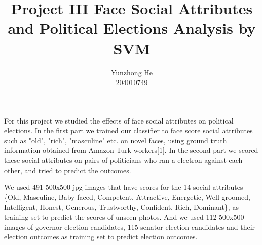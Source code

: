 \documentclass[12pt]{article}
\newenvironment{intro}[2][I Introduction]{\begin{trivlist}
\item[\hskip \labelsep {\bfseries #1}\hskip \labelsep {\bfseries #2}]}{\end{trivlist}}
\newenvironment{p1}[2][II Dataset]{\begin{trivlist}
\item[\hskip \labelsep {\bfseries #1}\hskip \labelsep {\bfseries #2}]}{\end{trivlist}}
\begin{document}
 
 
\title{Project III Face Social Attributes and Political Elections Analysis by SVM}
\author{Yunzhong He\\ %
204010749} %
 
\maketitle

\begin{intro}{}
\item{}
For this project we studied the effects of face social attributes on political elections. In the first part we trained our classifier to face score social attributes such as "old", "rich", "masculine" etc. on novel faces, using ground truth information obtained from Amazon Turk workers[1]. In the second part we scored these social attributes on pairs of politicians who ran a electron against each other, and tried to predict the outcomes.
\end{intro}

\begin{p1}{}
\item{}
We used 491 500x500 jpg images that have scores for the 14 social attributes \{Old, Masculine, Baby-faced, Competent, Attractive, Energetic, Well-groomed, Intelligent, Honest, Generous, Trustworthy, Confident, Rich, Dominant\}, as training set to predict the scores of unseen photos. And we used 112 500x500 images of governor election candidates, 115 senator election candidates and their election outcomes as training set to predict election outcomes.
\end{p1}
\end{document}
